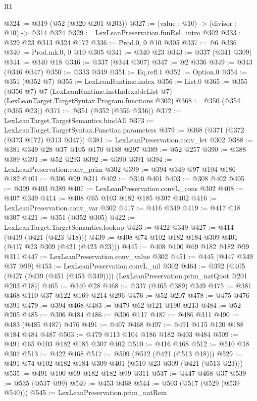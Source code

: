 \begin{lexlean}{R1}
\begin{coremodule}
@324 := @319 (@52 (@320 @201 @203))
@327 := (value : @10) -> (divisor : @10) -> @314 @324
@329 := LexLeanPreservation.funRel_intro @302
@333 := @329 @23 @313 @324 @172
@336 := Prod.{0, 0} @10 @305
@337 := @6 @336
@340 := Prod.mk.{0, 0} @10 @305
@341 := @340 @23
@343 := @337 (@341 @309)
@344 := @340 @18
@346 := @337 (@344 @307)
@347 := @2 @336
@349 := @343 (@346 @347)
@350 := @333 @349
@351 := Eq.refl.{1}
@352 := Option.{0}
@354 := @351 (@352 @7)
@355 := LexLeanRuntime.index
@356 := List.{0}
@365 := @355
    (@356 @7)
    @7
    (LexLeanRuntime.instIndexableList @7)
    (LexLeanTarget.TargetSyntax.Program.functions @302)
@368 := @350 (@354 (@365 @23))
@371 := @351 (@352 (@356 @336))
@372 := LexLeanTarget.TargetSemantics.bindAll
@373 := LexLeanTarget.TargetSyntax.Function.parameters
@379 := @368 (@371 (@372 (@373 @172) @313 @347))
@381 := LexLeanPreservation.conv_let @302
@388 := @381 @349 @28 @37 @105 @170 @188 @297
@389 := @52 @257
@390 := @388 @389
@391 := @52 @293
@392 := @390 @391
@394 := LexLeanPreservation.conv_prim @302
@399 := @394 @349 @97 @104 @186 @182
@401 := @306 @99 @311
@402 := @310 @401
@403 := @308 @402
@405 := @399 @403 @389
@407 := LexLeanPreservation.convL_cons @302
@408 := @407 @349
@414 := @408 @65 @103 @182 @185 @307 @402
@416 := LexLeanPreservation.conv_var @302
@417 := @416 @349
@419 := @417 @18 @307
@421 := @351 (@352 @305)
@422 := LexLeanTarget.TargetSemantics.lookup
@423 := @422 @349
@427 := @414 (@419 (@421 (@423 @18)))
@439 := @408 @74 @102 @182 @184 @309 @401 (@417 @23 @309 (@421 (@423 @23)))
@445 := @408 @100 @69 @182 @182 @99 @311
@447 := LexLeanPreservation.conv_value @302
@451 := @445 (@447 @349 @37 @99)
@453 := LexLeanPreservation.convL_nil @302
@464 := @392
    (@405 (@427 (@439 (@451 (@453 @349)))) (LexLeanPreservation.prim_natQuot @201 @203 @18))
@465 := @340 @28
@468 := @337 (@465 @389) @349
@475 := @381 @468 @110 @37 @122 @169 @214 @296
@476 := @52 @207
@478 := @475 @476 @391
@479 := @394 @468
@483 := @479 @62 @121 @190 @213
@484 := @52 @205
@485 := @306 @484
@486 := @306 @117
@487 := @486 @311
@490 := @483 (@485 @487) @476
@491 := @407 @468
@497 := @491 @115 @120 @188 @184 @484 @487
@503 := @479 @113 @104 @186 @182 @403 @484
@509 := @491 @65 @103 @182 @185 @307 @402
@510 := @416 @468
@512 := @510 @18 @307
@513 := @422 @468
@517 := @509 (@512 (@421 (@513 @18)))
@529 := @491 @74 @102 @182 @184 @309 @401 (@510 @23 @309 (@421 (@513 @23)))
@535 := @491 @100 @69 @182 @182 @99 @311
@537 := @447 @468 @37
@539 := @535 (@537 @99)
@540 := @453 @468
@544 := @503 (@517 (@529 (@539 @540)))
@545 := LexLeanPreservation.prim_natRem

\end{coremodule}
\end{lexlean}
